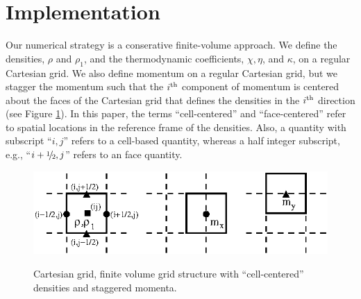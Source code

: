 \documentclass[final]{siamltex}
\newcommand{\sfrac}[2]{\mathchoice
  {\kern0em\raise.5ex\hbox{\the\scriptfont0 #1}\kern-.15em/
   \kern-.15em\lower.25ex\hbox{\the\scriptfont0 #2}}
  {\kern0em\raise.5ex\hbox{\the\scriptfont0 #1}\kern-.15em/
   \kern-.15em\lower.25ex\hbox{\the\scriptfont0 #2}}
  {\kern0em\raise.5ex\hbox{\the\scriptscriptfont0 #1}\kern-.2em/
   \kern-.15em\lower.25ex\hbox{\the\scriptscriptfont0 #2}}
  {#1\!/#2}}
\def\myhalf {\sfrac{1}{2}}
\begin{document}
\section{Implementation}
Our numerical strategy is a conserative finite-volume approach.  We define 
the densities, $\rho$ and $\rho_1$, and the thermodynamic coefficients, 
$\chi, \eta$, and $\kappa$, on a regular Cartesian grid.
We also define momentum on a regular Cartesian grid, but we stagger the momentum such that 
the $i^{\rm th}$ component of momentum is centered about the faces of the 
Cartesian grid that defines the densities in the $i^{\rm th}$ direction
(see Figure \ref{fig:grid}).  In this paper, the terms ``cell-centered''
and ``face-centered'' refer to spatial locations in the reference frame
of the densities.  Also, a quantity with subscript ``$i,j$'' refers to a cell-based
quantity, whereas a half integer subscript, e.g., ``$i+\myhalf,j$''
refers to an face quantity.
\begin{figure}[tb]
\centering
\includegraphics[width=6in]{grid}
\label{fig:grid}
\caption{Cartesian grid, finite volume grid structure with ``cell-centered'' densities
and staggered momenta.}
\end{figure}
\end{document}
